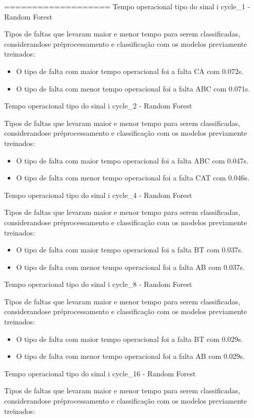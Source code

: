 ===================
Tempo operacional tipo do sinal i cycle_1 - Random Forest
\item Tipos de faltas que levaram maior e menor tempo para serem classificadas, considerando\hyph se pré\hyph processamento e classificação com os modelos previamente treinados:
\begin{itemize}
\item O tipo de falta com maior tempo operacional foi a falta CA com 0.072s.
\item O tipo de falta com menor tempo operacional foi a falta ABC com 0.071s.
\end{itemize}
Tempo operacional tipo do sinal i cycle_2 - Random Forest
\item Tipos de faltas que levaram maior e menor tempo para serem classificadas, considerando\hyph se pré\hyph processamento e classificação com os modelos previamente treinados:
\begin{itemize}
\item O tipo de falta com maior tempo operacional foi a falta ABC com 0.047s.
\item O tipo de falta com menor tempo operacional foi a falta CAT com 0.046s.
\end{itemize}
Tempo operacional tipo do sinal i cycle_4 - Random Forest
\item Tipos de faltas que levaram maior e menor tempo para serem classificadas, considerando\hyph se pré\hyph processamento e classificação com os modelos previamente treinados:
\begin{itemize}
\item O tipo de falta com maior tempo operacional foi a falta BT com 0.037s.
\item O tipo de falta com menor tempo operacional foi a falta AB com 0.037s.
\end{itemize}
Tempo operacional tipo do sinal i cycle_8 - Random Forest
\item Tipos de faltas que levaram maior e menor tempo para serem classificadas, considerando\hyph se pré\hyph processamento e classificação com os modelos previamente treinados:
\begin{itemize}
\item O tipo de falta com maior tempo operacional foi a falta BT com 0.029s.
\item O tipo de falta com menor tempo operacional foi a falta AB com 0.029s.
\end{itemize}
Tempo operacional tipo do sinal i cycle_16 - Random Forest
\item Tipos de faltas que levaram maior e menor tempo para serem classificadas, considerando\hyph se pré\hyph processamento e classificação com os modelos previamente treinados:
